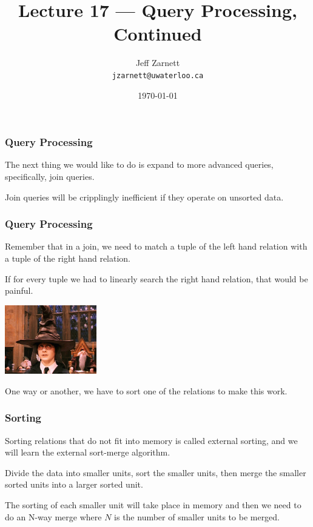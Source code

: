 

\title{Lecture 17 --- Query Processing, Continued }

\author{Jeff Zarnett \\ \small \texttt{jzarnett@uwaterloo.ca}}
\date{\today}




\begin{frame}
  \titlepage

 \end{frame}
 
 

\begin{frame}
\frametitle{Query Processing}

The next thing we would like to do is expand to more advanced queries, specifically, join queries. 

Join queries will be cripplingly inefficient if they operate on unsorted data. 

 \end{frame}
 
 

\begin{frame}
\frametitle{Query Processing}



Remember that in a join, we need to match a tuple of the left hand relation with a tuple of the right hand relation. 

If for every tuple we had to linearly search the right hand relation, that would be painful. 

\begin{center}
	\includegraphics[width=0.3\textwidth]{images/sorting.jpg}
\end{center}

One way or another, we have to sort one of the relations to make this work.

\end{frame}


\begin{frame}
\frametitle{Sorting}

Sorting relations that do not fit into memory is called external sorting, and we will learn the external sort-merge algorithm. 

Divide the data into smaller units, sort the smaller units, then merge the smaller sorted units into a larger sorted unit. 

The sorting of each smaller unit will take place in memory and then we need to do an N-way merge where $N$ is the number of smaller units to be merged.


\end{frame}


